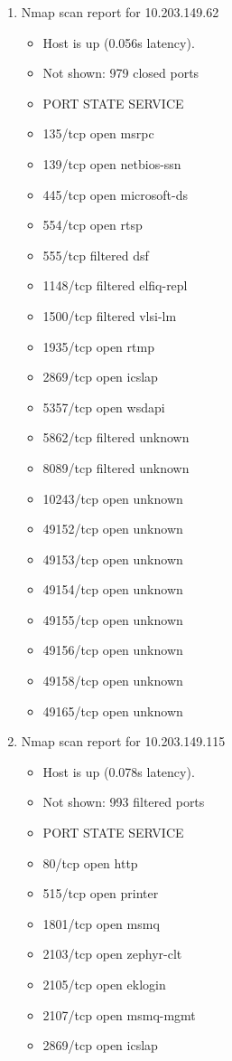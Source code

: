 \documentclass[12pt]{article}
\begin{document}
\begin{enumerate}
\item Nmap scan report for 10.203.149.62
\begin{itemize}\item 
Host is up (0.056s latency).\item 
Not shown: 979 closed ports\item 
PORT      STATE    SERVICE\item 
135/tcp   open     msrpc\item 
139/tcp   open     netbios-ssn\item 
445/tcp   open     microsoft-ds\item 
554/tcp   open     rtsp\item 
555/tcp   filtered dsf\item 
1148/tcp  filtered elfiq-repl\item 
1500/tcp  filtered vlsi-lm\item 
1935/tcp  open     rtmp\item 
2869/tcp  open     icslap\item 
5357/tcp  open     wsdapi\item 
5862/tcp  filtered unknown\item 
8089/tcp  filtered unknown\item 
10243/tcp open     unknown\item 
49152/tcp open     unknown\item 
49153/tcp open     unknown\item 
49154/tcp open     unknown\item 
49155/tcp open     unknown\item 
49156/tcp open     unknown\item 
49158/tcp open     unknown\item 
49165/tcp open     unknown
\end{itemize}

\item Nmap scan report for 10.203.149.115
\begin{itemize}\item 
Host is up (0.078s latency).\item 
Not shown: 993 filtered ports\item 
PORT     STATE SERVICE\item 
80/tcp   open  http\item 
515/tcp  open  printer\item 
1801/tcp open  msmq\item 
2103/tcp open  zephyr-clt\item 
2105/tcp open  eklogin\item 
2107/tcp open  msmq-mgmt\item 
2869/tcp open  icslap
\end{itemize}


\end{enumerate}
\end{document}
